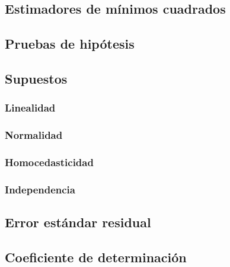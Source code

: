 \documentclass[
]{book}
\theoremstyle{definition}
\theoremstyle{definition}
\theoremstyle{definition}
\theoremstyle{definition}
\theoremstyle{remark}
\begin{document}
\hypertarget{estimadores-de-muxednimos-cuadrados}{%
\subsection{Estimadores de mínimos cuadrados}\label{estimadores-de-muxednimos-cuadrados}}

\hypertarget{pruebas-de-hipuxf3tesis-1}{%
\subsection{Pruebas de hipótesis}\label{pruebas-de-hipuxf3tesis-1}}

\hypertarget{supuestos}{%
\subsection{Supuestos}\label{supuestos}}

\hypertarget{linealidad}{%
\subsubsection*{Linealidad}\label{linealidad}}

\hypertarget{normalidad}{%
\subsubsection*{Normalidad}\label{normalidad}}

\hypertarget{homocedasticidad}{%
\subsubsection*{Homocedasticidad}\label{homocedasticidad}}

\hypertarget{independencia}{%
\subsubsection*{Independencia}\label{independencia}}

\hypertarget{error-estuxe1ndar-residual}{%
\subsection{Error estándar residual}\label{error-estuxe1ndar-residual}}

\hypertarget{coeficiente-de-determinaciuxf3n}{%
\subsection{Coeficiente de determinación}\label{coeficiente-de-determinaciuxf3n}}
\end{document}
